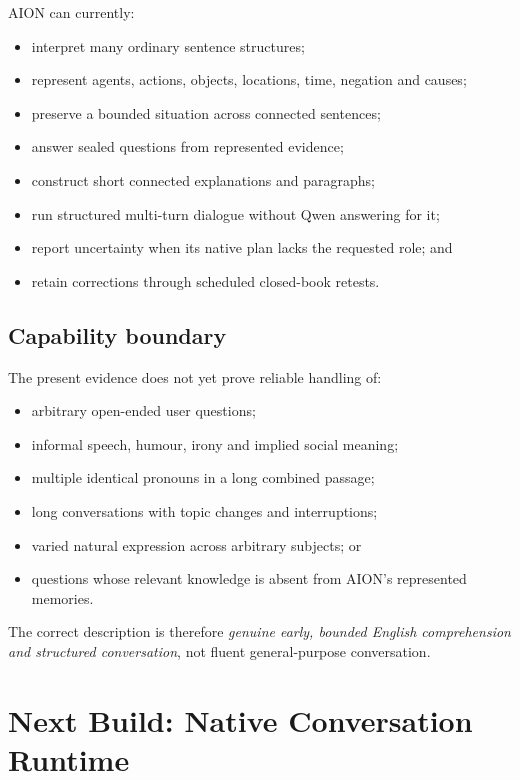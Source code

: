 \documentclass[11pt,a4paper]{article}
\begin{document}
AION can currently:

\begin{itemize}
  \item interpret many ordinary sentence structures;
  \item represent agents, actions, objects, locations, time, negation and causes;
  \item preserve a bounded situation across connected sentences;
  \item answer sealed questions from represented evidence;
  \item construct short connected explanations and paragraphs;
  \item run structured multi-turn dialogue without Qwen answering for it;
  \item report uncertainty when its native plan lacks the requested role; and
  \item retain corrections through scheduled closed-book retests.
\end{itemize}

\subsection{Capability boundary}

The present evidence does not yet prove reliable handling of:

\begin{itemize}
  \item arbitrary open-ended user questions;
  \item informal speech, humour, irony and implied social meaning;
  \item multiple identical pronouns in a long combined passage;
  \item long conversations with topic changes and interruptions;
  \item varied natural expression across arbitrary subjects; or
  \item questions whose relevant knowledge is absent from AION's represented memories.
\end{itemize}

The correct description is therefore \emph{genuine early, bounded English comprehension and
structured conversation}, not fluent general-purpose conversation.

\section{Next Build: Native Conversation Runtime}
\end{document}

